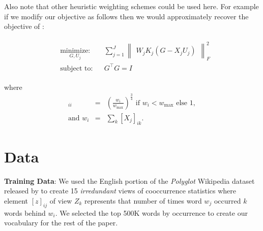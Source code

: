\documentclass[11pt]{article}
\newcommand{\minimize}[3]{
\begin{aligned}
& \underset{#1}{\textrm{minimize:}}
& & #2 \\
& \textrm{subject to:}
& &  #3
\end{aligned}
}
\newcommand{\remove}[1]{}
\begin{document}
Also note that other heuristic weighting schemes could be used
here. For example if we modify our objective as follows then we would
approximately recover the objective of \cite{pennington2014glove}:

\begin{eqnarray}
  \label{eq:gcca3}
\minimize{G,U_j}{\sum_{j=1}^J \begin{Vmatrix} W_j K_j(G - X_jU_j) \end{Vmatrix}^2_F}{G^\top G = I }
\end{eqnarray}

where
\begin{eqnarray}
[W_j]_{ii} &=& \left(\frac{w_i}{w_{\max}}\right)^{\frac{3}{4}} \text{ if } w_i <
  w_{\max} \text{ else } 1, \nonumber \\
  \text{and } w_i &=&  \sum_k [X_j]_{ik}. \nonumber
\end{eqnarray}


\section{Data}
\label{sec:data}
\noindent\textbf{Training Data}: We used the English portion of the \textit{Polyglot} Wikipedia dataset
released by  to create 15 \emph{irredundant} views of
cooccurrence statistics where element $[z]_{ij}$ of view $Z_k$
represents that number of times word $w_j$ occurred $k$ words behind
$w_i$. \remove{We lowercased all the words and discarded all
words which were longer than 5 characters and contained more than 3 non
alphabetical symbols. This was done to preserves years and smaller
numbers.}
We selected the top 500K words by occurrence to 
create our vocabulary for the rest of the paper.
\end{document}
